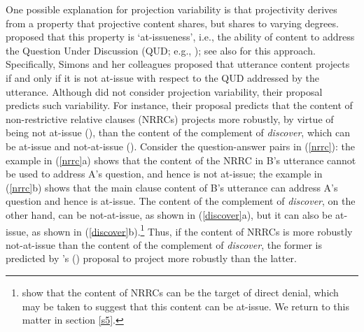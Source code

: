 \documentclass[11pt,fleqn]{article}
\newcommand{\6}{\mbox{$[\hspace*{-.6mm}[$}}
\newcommand{\9}{\mbox{$]\hspace*{-.6mm}]$}}
\newcommand{\citetpos}[1]{\citeauthor{#1}'s (\citeyear{#1})}
\begin{document}
One possible explanation for projection variability is that projectivity derives from a property that projective content shares, but shares to varying degrees. \citet{brst-salt10} proposed that this property is `at-issueness', i.e., the ability of content to address the Question Under Discussion (QUD; e.g., \citealt{roberts12}); see also \citealt{brst-ar} for this approach. Specifically, Simons and her colleagues proposed that utterance content projects if and only if it is not at-issue with respect to the QUD addressed by the utterance. Although \citet{brst-salt10} did not consider projection variability, their proposal predicts such variability. For instance, their proposal predicts that the content of non-restrictive relative clauses (NRRCs) projects more robustly, by virtue of being not at-issue (\citealt{potts05}), than the content of the complement of {\em discover}, which can be at-issue and not-at-issue (\citealt{simons07}). Consider the question-answer pairs in (\ref{nrrc}): the example in (\ref{nrrc}a) shows that the content of the NRRC in B's utterance cannot be used to address A's question, and hence is not at-issue; the example in (\ref{nrrc}b) shows that the main clause content of B's utterance can address A's question and hence is at-issue. The content of the complement of {\em discover}, on the other hand, can be not-at-issue, as shown in (\ref{discover}a), but it can also be at-issue, as shown in (\ref{discover}b).\footnote{\citet{syrett-koev2015} show that the content of NRRCs can be the target of direct denial, which may be taken to suggest that this content can be at-issue. We return to this matter in section \ref{s5}.} Thus, if the content of NRRCs is more robustly not-at-issue than the content of the complement of {\em discover}, the former is predicted by \citetpos{brst-salt10} proposal to project more robustly than the latter. 
\end{document}
